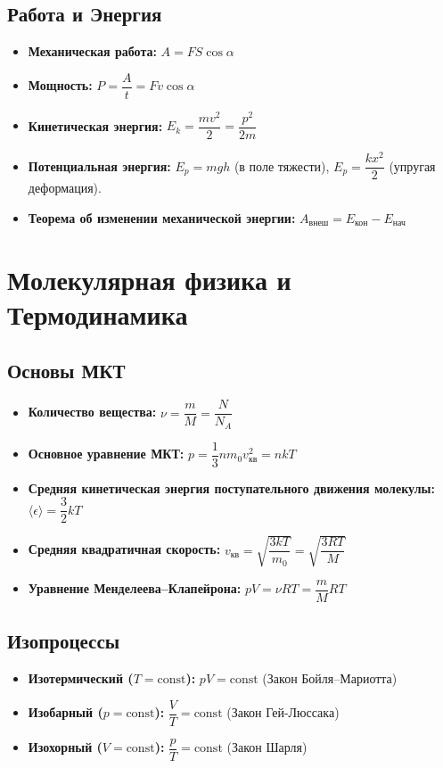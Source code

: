 \documentclass[11pt, a4paper]{article}
\begin{document}
\subsection{Работа и Энергия}
\begin{itemize}
    \item \textbf{Механическая работа:} $A = F S \cos\alpha$
    \item \textbf{Мощность:} $P = \dfrac{A}{t} = F v \cos\alpha$
    \item \textbf{Кинетическая энергия:} $E_k = \dfrac{m v^2}{2} = \dfrac{p^2}{2m}$
    \item \textbf{Потенциальная энергия:} $E_p = m g h$ (в поле тяжести), \quad $E_p = \dfrac{k x^2}{2}$ (упругая деформация).
    \item \textbf{Теорема об изменении механической энергии:} $A_{\text{внеш}} = E_{\text{кон}} - E_{\text{нач}}$
\end{itemize}

\section{Молекулярная физика и Термодинамика}

\subsection{Основы МКТ}
\begin{itemize}
    \item \textbf{Количество вещества:} $\nu = \dfrac{m}{M} = \dfrac{N}{N_A}$
    \item \textbf{Основное уравнение МКТ:} $p = \dfrac{1}{3} n m_0 v_{\text{кв}}^2 = n k T$
    \item \textbf{Средняя кинетическая энергия поступательного движения молекулы:} $\langle \epsilon \rangle = \dfrac{3}{2} k T$
    \item \textbf{Средняя квадратичная скорость:} $v_{\text{кв}} = \sqrt{\dfrac{3 k T}{m_0}} = \sqrt{\dfrac{3 R T}{M}}$
    \item \textbf{Уравнение Менделеева--Клапейрона:} $p V = \nu R T = \dfrac{m}{M} R T$
\end{itemize}

\subsection{Изопроцессы}
\begin{itemize}
    \item \textbf{Изотермический ($T = \text{const}$):} $p V = \text{const}$ (Закон Бойля--Мариотта)
    \item \textbf{Изобарный ($p = \text{const}$):} $\dfrac{V}{T} = \text{const}$ (Закон Гей-Люссака)
    \item \textbf{Изохорный ($V = \text{const}$):} $\dfrac{p}{T} = \text{const}$ (Закон Шарля)
\end{itemize}
\end{document}
